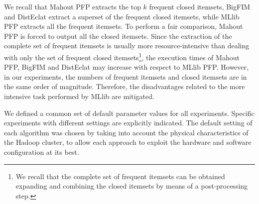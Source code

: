 We recall that Mahout PFP extracts the top $k$ frequent closed itemsets, BigFIM
and DistEclat extract a superset of the frequent closed itemsets,
while MLlib PFP extracts all the frequent itemsets.
To perform a fair comparison, Mahout PFP is forced to output all the closed
itemsets.
Since the extraction of the complete set of frequent itemsets is usually
more resource-intensive than dealing with only the set of frequent closed
itemsets\footnote{We recall that the complete set of frequent itemsets can be
obtained expanding and combining the closed itemsets by means of a
post-processing step.},
the execution times of Mahout PFP, BigFIM and DistEclat may increase with respect
to MLlib PFP.
However, in our experiments, the numbers of frequent itemsets and closed itemsets are in the same order of magnitude.
Therefore, the disadvantages related to the more intensive task performed
by MLlib are mitigated.






We defined a common set of default parameter values for all experiments.
Specific experiments with different settings are explicitly indicated.
The default setting of each algorithm was chosen by taking into account
the physical characteristics of the Hadoop cluster,
to allow each approach to exploit the hardware and software configuration at its best.

